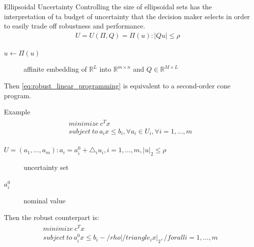 \documentclass{beamer}
\begin{document}
\begin{frame}{Ellipsoidal Uncertainty}
Controlling the size of ellipsoidal sets has the interpretation of ta budget of uncertainty that the decision maker selects in order to easily trade off robustness and performance. 
\begin{align*}
U = U(\Pi,Q) = {\Pi(u) : \lvert Qu \rvert \leq \rho} 
\end{align*}
\begin{description}
\item [$u \leftarrow \Pi(u)$] affinite embedding of $\mathbb{R}^L$ into $\mathbb{R}^{m \times n}$ and $Q \in \mathbb{R}^{M \times L}$
\end{description}
Then \ref{eq:robust_linear_programming} is equivalent to a second-order cone program.

\begin{block}{Example}
\begin{align*}\begin{split}
& minimize~c^Tx \\
& subject~to~a_ix \leq b_i, \forall a_i \in U_i, \forall i = 1,\dots,m
\end{split}\end{align*}
\begin{description}
\item [$U = {(a_1,\dots,a_m) : a_i=a_i^0 + \triangle_i u_i, i=1,\dots,m, \lvert u \rvert_2 \leq \rho}$] uncertainty set
\item [$a_i^0$] nominal value
\end{description}

Then the robust counterpart is:
\begin{align*}
\begin{split}
& minimize~c^Tx \\
& subject~to~a_i^0x \leq b_i - /rho \lvert /triangle_ix \rvert_2, /forall i=1,\dots,m
\end{split}
\end{align*}
\end{block}
\end{frame}
\end{document}
